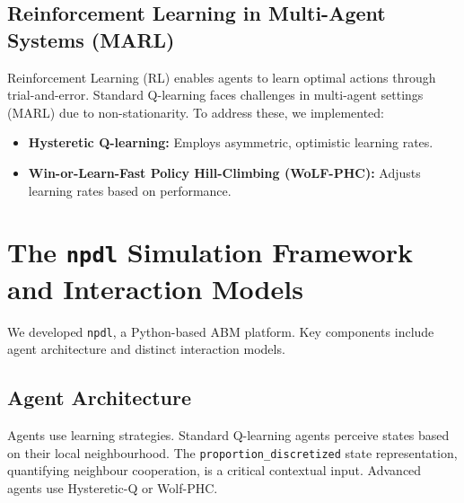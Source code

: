 \documentclass[]{llncs} %
\begin{document}
\subsection{Reinforcement Learning in Multi-Agent Systems (MARL)}
Reinforcement Learning (RL) enables agents to learn optimal actions through trial-and-error. %
Standard Q-learning faces challenges in multi-agent settings (MARL) due to non-stationarity. %
To address these, we implemented:
\begin{itemize}
    \item \textbf{Hysteretic Q-learning:} Employs asymmetric, optimistic learning rates. %
    \item \textbf{Win-or-Learn-Fast Policy Hill-Climbing (WoLF-PHC):} Adjusts learning rates based on performance. %
\end{itemize}

\section{The \texttt{npdl} Simulation Framework and Interaction Models}
\label{sec:framework}
We developed \texttt{npdl}, a Python-based ABM platform. Key components include agent architecture and distinct interaction models.

\subsection{Agent Architecture}
Agents use learning strategies. Standard Q-learning agents perceive states based on their local neighbourhood. The \texttt{proportion_discretized} state representation, quantifying neighbour cooperation, is a critical contextual input. Advanced agents use Hysteretic-Q or Wolf-PHC.
\end{document}
